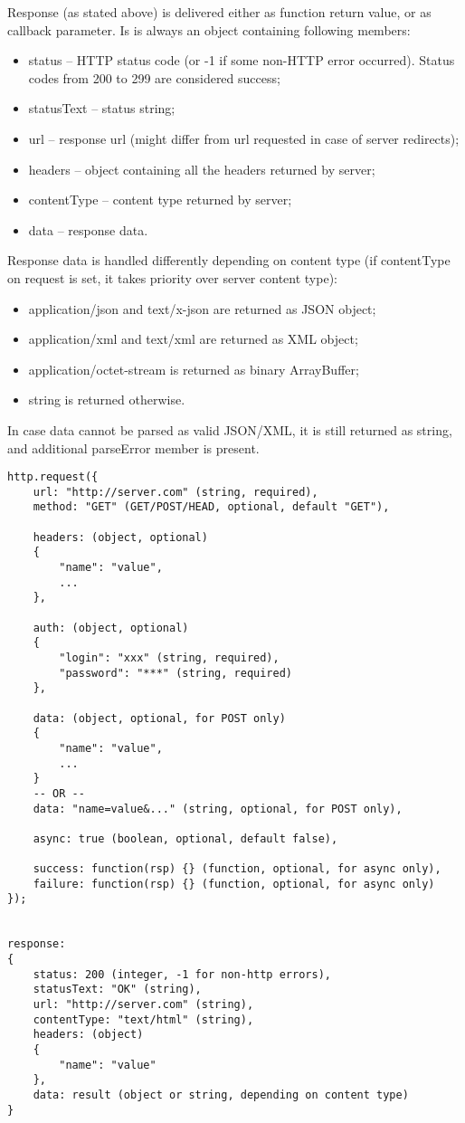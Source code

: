 Response (as stated above) is delivered either as function return value, or as callback parameter. Is is always an object containing following members:

\begin{itemize}
\item status – HTTP status code (or -1 if some non-HTTP error occurred). Status codes from 200 to 299 are considered success;
\item statusText – status string;
\item url – response url (might differ from url requested in case of server redirects);
\item headers – object containing all the headers returned by server;
\item contentType – content type returned by server;
\item data – response data.
\end{itemize}


Response data is handled differently depending on content type (if contentType on request is set, it takes priority over server content type):
\begin{itemize}
\item application/json and text/x-json are returned as JSON object;
\item application/xml and text/xml are returned as XML object;
\item application/octet-stream is returned as binary ArrayBuffer;
\item string is returned otherwise.
\end{itemize}
In case data cannot be parsed as valid JSON/XML, it is still returned as string, and additional parseError member is present.


\begin{lstlisting}
http.request({
	url: "http://server.com" (string, required),
	method: "GET" (GET/POST/HEAD, optional, default "GET"),
	
	headers: (object, optional)
	{
		"name": "value",
		...
	},
	
	auth: (object, optional)
	{
		"login": "xxx" (string, required),
		"password": "***" (string, required)
	},
	
	data: (object, optional, for POST only)
	{
		"name": "value",
		...
	}
	-- OR --
	data: "name=value&..." (string, optional, for POST only),

	async: true (boolean, optional, default false),
	
	success: function(rsp) {} (function, optional, for async only),
	failure: function(rsp) {} (function, optional, for async only)
});


response:
{
	status: 200 (integer, -1 for non-http errors),
	statusText: "OK" (string),
	url: "http://server.com" (string),
	contentType: "text/html" (string),
	headers: (object)
	{
		"name": "value"
	},
	data: result (object or string, depending on content type)
}
\end{lstlisting}


